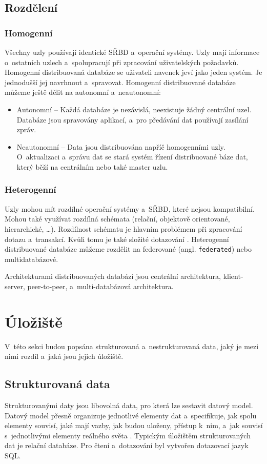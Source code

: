 \subsection{Rozdělení}
\subsubsection{Homogenní}
Všechny uzly používají identické SŘBD a~operační systémy. Uzly mají informace o~ostatních uzlech a~spolupracují při zpracování uživatelských požadavků. Homogenní distribuovaná databáze se uživateli navenek jeví jako jeden systém. Je jednodušší jej navrhnout a~spravovat. Homogenní distribuované databáze můžeme ještě dělit na autonomní a~neautonomní:

\begin{itemize}
    \item Autonomní -- Každá databáze je nezávislá, neexistuje žádný centrální uzel. Databáze jsou spravovány aplikací, a~pro předávání dat používají zasílání zpráv.
    
    \item Neautonomní -- Data jsou distribuována napříč homogenními uzly. O~aktualizaci a~správu dat se stará systém řízení distribuované báze dat, který běží na centrálním nebo také master uzlu.
\end{itemize}

\subsubsection{Heterogenní}
Uzly mohou mít rozdílné operační systémy a~SŘBD, které nejsou kompatibilní. Mohou také využívat rozdílná schémata (relační, objektově orientované, hierarchické, \ldots). Rozdílnost schématu je hlavním problémem při zpracování dotazu a~transakcí. Kvůli tomu je také složité dotazování \cite{wikiDBMS}. Heterogenní distribuované databáze můžeme rozdělit na federované (angl. \texttt{federated}) nebo multidatabázové.

Architekturami distribuovaných databází jsou centrální architektura, klient-server, peer-to-peer, a~multi-databázová architektura.

\section{Úložiště} \label{storage}
V~této sekci budou popsána strukturovaná a~nestrukturovaná data, jaký je mezi nimi rozdíl a~jaká jsou jejich úložiště.

\subsection{Strukturovaná data}
Strukturovanými daty jsou libovolná data, pro která lze sestavit datový model. Datový model přesně organizuje jednotlivé elementy dat a~specifikuje, jak spolu elementy souvisí, jaké mají vazby, jak budou uloženy, přístup k~nim, a~jak souvisí s~jednotlivými elementy reálného světa \cite{structData}. Typickým úložištěm strukturovaných dat je relační databáze. Pro čtení a~dotazování byl vytvořen dotazovací jazyk SQL.

